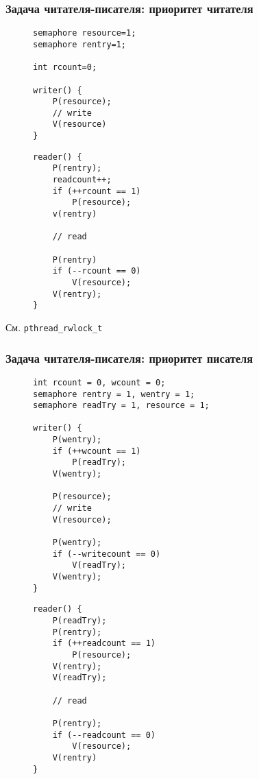 \documentclass[aspectratio=169, pdf, 8pt, unicode]{beamer}
\begin{document}
\begin{frame}[fragile]
\frametitle{Задача читателя-писателя: приоритет читателя}
\begin{figure}[H]
\begin{minipage}{0.4\textwidth}
\begin{verbatim}
semaphore resource=1;
semaphore rentry=1;

int rcount=0;

writer() {
    P(resource);
    // write
    V(resource)
}
\end{verbatim}
\end{minipage}
\begin{minipage}{0.4\textwidth}
\begin{verbatim}
reader() {
    P(rentry);
    readcount++;
    if (++rcount == 1)
        P(resource);
    v(rentry)

    // read

    P(rentry)
    if (--rcount == 0)
        V(resource);
    V(rentry);
}
\end{verbatim}
\end{minipage}
\end{figure}
См. \texttt{pthread\_rwlock\_t}
\end{frame}

\begin{frame}[fragile]
\frametitle{Задача читателя-писателя: приоритет писателя}
\begin{figure}[H]
\begin{minipage}{0.4\textwidth}
\begin{verbatim}
int rcount = 0, wcount = 0;
semaphore rentry = 1, wentry = 1;
semaphore readTry = 1, resource = 1;

writer() {
    P(wentry);
    if (++wcount == 1)
        P(readTry);
    V(wentry);

    P(resource);
    // write
    V(resource);

    P(wentry);
    if (--writecount == 0)
        V(readTry);
    V(wentry);
}
\end{verbatim}
\end{minipage}
\begin{minipage}{0.4\textwidth}
\begin{verbatim}
reader() {
    P(readTry);
    P(rentry);
    if (++readcount == 1)
        P(resource);
    V(rentry);
    V(readTry);

    // read

    P(rentry);
    if (--readcount == 0)
        V(resource);
    V(rentry)
}
\end{verbatim}
\end{minipage}
\end{figure}
\end{frame}
\end{document}
